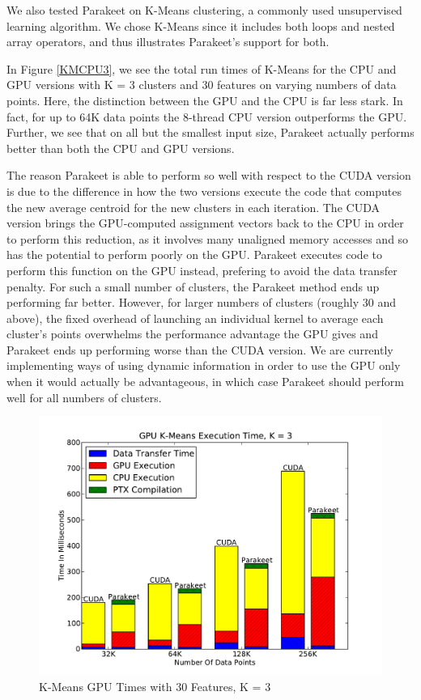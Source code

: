 \documentclass[10pt,twocolumn]{article}
\begin{document}
We also tested Parakeet on K-Means clustering, a commonly used unsupervised learning algorithm.  We chose K-Means since it includes both loops and nested array operators, and thus illustrates Parakeet's support for both.

In Figure \ref{KMCPU3}, we see the total run times of K-Means for the CPU and GPU versions with K = 3 clusters and 30 features on varying numbers of data points.  Here, the distinction between the GPU and the CPU is far less stark.  In fact, for up to 64K data points the 8-thread CPU version outperforms the GPU.  Further, we see that on all but the smallest input size, Parakeet actually performs better than both the CPU and GPU versions.

The reason Parakeet is able to perform so well with respect to the CUDA version is due to the difference in how the two versions execute the code that computes the new average centroid for the new clusters in each iteration.  The CUDA version brings the GPU-computed assignment vectors back to the CPU in order to perform this reduction, as it involves many unaligned memory accesses and so has the potential to perform poorly on the GPU.  Parakeet executes code to perform this function on the GPU instead, prefering to avoid the data transfer penalty.  For such a small number of clusters, the Parakeet method ends up performing far better.  However, for larger numbers of clusters (roughly 30 and above), the fixed overhead of launching an individual kernel to average each cluster's points overwhelms the performance advantage the GPU gives and Parakeet ends up performing worse than the CUDA version.  We are currently implementing ways of using dynamic information in order to use the GPU only when it would actually be advantageous, in which case Parakeet should perform well for all numbers of clusters.

\begin{figure}
\includegraphics[scale=0.4]{KMGPU.pdf}
\caption{K-Means GPU Times with 30 Features, K = 3}
\label{KMGPU}
\end{figure}
\end{document}
